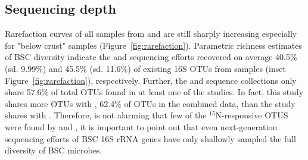\subsection{Sequencing depth}
Rarefaction curves of all samples from \citet{Steven_2013} and
\citet{Garcia_Pichel_2013} are still sharply increasing especially for "below
crust" samples (Figure~\ref{fig:rarefaction}). Parametric richness estimates of
BSC diversity indicate the \citet{Steven_2013} and \citet{Garcia_Pichel_2013}
sequencing efforts recovered on average 40.5\% (sd. 9.99\%) and 45.5\% (sd.
11.6\%) of existing 16S OTUs from samples (inset Figure~\ref{fig:rarefaction}),
respectively. Further, the \citet{Steven_2013} and \citet{Garcia_Pichel_2013}
sequence collections only share 57.6\% of total OTUs found in at least one of
the studies. In fact, this study shares more OTUs with \citet{Steven_2013},
62.4\% of OTUs in the combined data, than the \citet{Steven_2013} study shares
with \citet{Garcia_Pichel_2013}.  Therefore, is not alarming that few of the
$^{15}$N-responsive OTUS were found by \citet{Garcia_Pichel_2013} and
\citet{Steven_2013}, it is important to point out that even next-generation
sequencing efforts of BSC 16S rRNA genes have only shallowly sampled the full
diversity of BSC microbes.  
%
